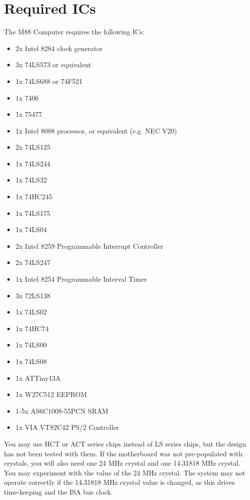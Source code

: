 \documentclass[twoside,10pt,letterpaper]{refart}
\begin{document}
\section{Required ICs}
The {\codefamily M88} Computer requires the following ICs:
\begin{itemize}
    \item 2x Intel 8284 clock generator
    \item 3x 74LS573 or equivalent
    \item 1x 74LS688 or 74F521
    \item 1x 7406
    \item 1x 75477
    \item 1x Intel 8088 processor, or equivalent (e.g. NEC V20)
    \item 2x 74LS125
    \item 1x 74LS244
    \item 1x 74LS32
    \item 1x 74HC245
    \item 1x 74LS175
    \item 1x 74LS04
    \item 2x Intel 8259 Programmable Interrupt Controller
    \item 2x 74LS247
    \item 1x Intel 8254 Programmable Interval Timer
    \item 3x 72LS138
    \item 1x 74LS02
    \item 1x 74HC74
    \item 1x 74LS00
    \item 1x 74LS08
    \item 1x ATTiny13A
    \item 1x W27C512 EEPROM
    \item 1-5x AS6C1008-55PCN SRAM
    \item 1x VIA VT82C42 PS/2 Controller
\end{itemize}

You may use HCT or ACT series chips instead of LS series chips, but the design has not
been tested with them. If the motherboard was not pre-populated with crystals, you will
also need one 24 MHz crystal and one 14.31818 MHz crystal. You may experiment with the
value of the 24 MHz crystal. The system may not operate correctly if the 14.31818 MHz
crystal value is changed, as this drives time-keeping and the ISA bus clock.
\end{document}
